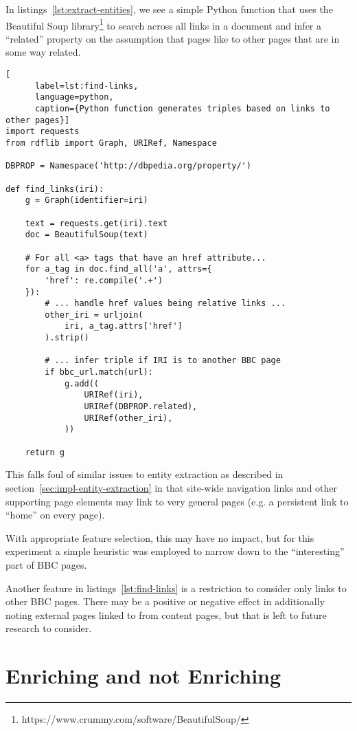 In listings~\ref{lst:extract-entities}, we see a simple Python
function that uses the Beautiful Soup
library\footnote{https://www.crummy.com/software/BeautifulSoup/} to
search across all links in a document and infer a ``related''
property on the assumption that pages like to other pages that are in
some way related.

\begin{centering}
  \begin{lstlisting}[
      label=lst:find-links,
      language=python,
      caption={Python function generates triples based on links to other pages}]
import requests
from rdflib import Graph, URIRef, Namespace

DBPROP = Namespace('http://dbpedia.org/property/')
    
def find_links(iri):
    g = Graph(identifier=iri)

    text = requests.get(iri).text
    doc = BeautifulSoup(text)

    # For all <a> tags that have an href attribute...
    for a_tag in doc.find_all('a', attrs={
        'href': re.compile('.+')
    }):
        # ... handle href values being relative links ...
        other_iri = urljoin(
            iri, a_tag.attrs['href']
        ).strip()

        # ... infer triple if IRI is to another BBC page
        if bbc_url.match(url):
            g.add((
                URIRef(iri),
                URIRef(DBPROP.related),
                URIRef(other_iri),
            ))

    return g
  \end{lstlisting}
\end{centering}

This falls foul of similar issues to entity extraction as described
in section~\ref{sec:impl-entity-extraction} in that site-wide
navigation links and other supporting page elements may link to
very general pages (e.g. a persistent link to ``home'' on every page).

With appropriate feature selection, this may have no impact, but for
this experiment a simple heuristic was employed to narrow down to
the ``interesting'' part of BBC pages.

Another feature in listings~\ref{lst:find-links} is a restriction
to consider only links to other BBC pages. There may be a positive
or negative effect in additionally noting external pages linked to from
content pages, but that is left to future research to consider.

\section{Enriching and not Enriching}

